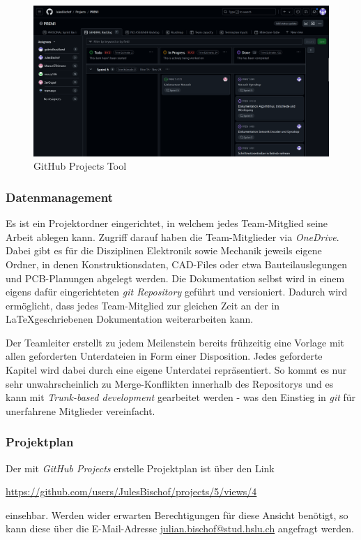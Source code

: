 \documentclass[main.tex]{subfiles} %
\begin{document}
\begin{figure}[H]
    \centering
    \includegraphics[page=1, width=1\textwidth]{./fig_Projektmanagement/Ansicht_GitHubProjects.png}
    \caption{GitHub Projects Tool}\label{fig:GitHubProjectsTool}
\end{figure}

\subsubsection*{Datenmanagement}
Es ist ein Projektordner eingerichtet, in welchem jedes Team-Mitglied seine Arbeit ablegen kann. Zugriff darauf
haben die Team-Mitglieder via \textit{OneDrive}.
Dabei gibt es für die Disziplinen Elektronik sowie Mechanik jeweils eigene Ordner, in denen Konstruktionsdaten,
CAD-Files oder etwa Bauteilauslegungen und PCB-Planungen abgelegt werden. Die Dokumentation
selbst wird in einem eigens dafür eingerichteten \textit{git Repository} geführt und versioniert.
Dadurch wird ermöglicht, dass jedes Team-Mitglied zur gleichen Zeit an der in \LaTeX geschriebenen
Dokumentation weiterarbeiten kann.

Der Teamleiter erstellt zu jedem Meilenstein bereits frühzeitig eine Vorlage
mit allen geforderten Unterdateien in Form einer Disposition. Jedes geforderte
Kapitel wird dabei durch eine eigene Unterdatei repräsentiert. So kommt es nur
sehr unwahrscheinlich zu Merge-Konflikten innerhalb des Repositorys und es kann
mit \textit{Trunk-based development} gearbeitet werden - was den Einstieg in
\textit{git} für unerfahrene Mitglieder vereinfacht.

\subsubsection*{Projektplan}
Der mit \textit{GitHub Projects} erstelle Projektplan ist über den Link

\href{https://github.com/users/JulesBischof/projects/5/views/4}{https://github.com/users/JulesBischof/projects/5/views/4}

einsehbar. Werden wider erwarten Berechtigungen für diese Ansicht benötigt, so
kann diese über die E-Mail-Adresse
\href{julian.bischof@stud.hslu.ch}{julian.bischof@stud.hslu.ch} angefragt
werden.
\end{document}
